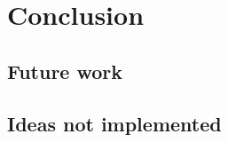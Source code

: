 \documentclass[../report.tex]{subfiles}
\begin{document}
\chapter{Conclusion}
\section{Future work}
\section{Ideas not implemented}
\end{document}
